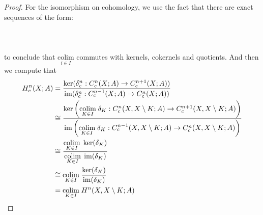 \documentclass[a4paper]{article}
\begin{document}
\begin{prp}{}{}
\begin{proof}
For the isomorphism on cohomology, we use the fact that there are exact sequences of the form: \\~\\
\\~\\
to conclude that $\underset{i\in I}{\text{colim}}$ commutes with kernels, cokernels and quotients. And then we compute that 
\begin{align*}
H_c^n(X;A)&=\frac{\ker(\delta_c^n:C_c^n(X;A)\to C_c^{n+1}(X;A))}{\operatorname{im}(\delta_c^n:C_c^{n-1}(X;A)\to C_c^n(X;A))}\\
&\cong\frac{\ker\left(\underset{K\in I}{\text{colim}}\;\delta_K:C_c^n(X,X\setminus K;A)\to C_c^{n+1}(X,X\setminus K;A)\right)}{\operatorname{im}\left(\underset{K\in I}{\text{colim}}\;\delta_K:C_c^{n-1}(X,X\setminus K;A)\to C_c^n(X,X\setminus K;A)\right)}\\
&\cong\frac{\underset{K\in I}{\text{colim}}\;\ker(\delta_K)}{\underset{K\in I}{\text{colim}}\;\operatorname{im}(\delta_K)}\\
&\cong\underset{K\in I}{\text{colim}}\;\frac{\ker(\delta_K)}{\operatorname{im}(\delta_K)}\\
&=\underset{K\in I}{\text{colim}}\;H^n(X,X\setminus K;A)
\end{align*}
\end{proof}
\end{prp}
\end{document}
